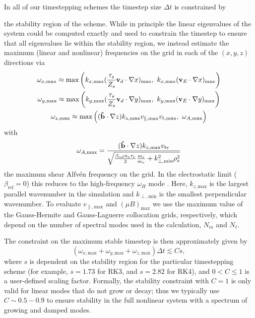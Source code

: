 \documentclass{jpp}
\renewcommand{\vec}[1]{\ensuremath{\mbox{$ {\bf #1} $}}} %
\begin{document}
In all of our timestepping schemes the timestep size $\Delta t$ is constrained by {\color{black} the stability region of the scheme. While in principle the linear eigenvalues of the system could be computed exactly and used to constrain the timestep to ensure that all eigenvalues lie within the stability region, we instead estimate the maximum (linear and nonlinear) frequencies on the grid in each of the $(x,y,z)$ directions via
\begin{gather}
    \omega_{x,\mathrm{max}} \approx \max\left(k_{x,\mathrm{max}} (\frac{\tau_s}{Z_s}\vec{v}_d\cdot\nabla x)_\mathrm{max},\ k_{x,\mathrm{max}} (\vec{v}_E\cdot \nabla x)_\mathrm{max}\right) \\
    \omega_{y,\mathrm{max}} \approx \max\left(k_{y,\mathrm{max}} (\frac{\tau_s}{Z_s}\vec{v}_d\cdot\nabla y)_\mathrm{max},\ k_{y,\mathrm{max}} (\vec{v}_E\cdot \nabla y)_\mathrm{max}\right) \\
    \omega_{z,\mathrm{max}} \approx \max \left((\bhat\cdot\nabla z)k_{z,\mathrm{max}} v_{\parallel,\mathrm{max}}  v_{t,\mathrm{max}},\  \omega_{A,\mathrm{max}}\right)
\end{gather}
with 
\begin{equation}
   \omega_{A,\mathrm{max}} = \frac{({\bf \hat{b}}\cdot\nabla z)k_{z,\mathrm{max}} v_{te}}{\sqrt{\frac{\beta_\mathrm{ref}n_e \tau_e}{2}\frac{m_i}{m_e} + k_{\perp,\mathrm{min}}^2 \rho_s^2}}
\end{equation}
the maximum shear Alfv\'en frequency on the grid. In the electrostatic limit ($\beta_\mathrm{ref} = 0$) this reduces to the high-frequency $\omega_H$ mode \citep{lee1987}.
Here, $k_{z,\mathrm{max}}$ is the largest parallel wavenumber in the simulation and $k_{\perp,\mathrm{min}}$ is the smallest perpendicular wavenumber. To evaluate $v_{\parallel,\mathrm{max}}$ and $(\mu B)_\mathrm{max}$ we use the maximum value of the Gauss-Hermite and Gauss-Laguerre collocation grids, respectively, which depend on the number of spectral modes used in the calculation, $N_m$ and $N_\ell$. 

The constraint on the maximum stable timestep is then approximately given by
\begin{equation}
    (\omega_{x,\mathrm{max}} + \omega_{y,\mathrm{max}} + \omega_{z,\mathrm{max}})\Delta t \lesssim C s,
\end{equation}
where $s$ is dependent on the stability region for the particular timestepping scheme (for example, $s=1.73$ for RK3, and $s=2.82$ for RK4), and $0<C\leq 1$ is a user-defined scaling factor. Formally, the stability constraint with $C=1$ is only valid for linear modes that do not grow or decay; thus we typically use $C\sim0.5-0.9$ to ensure stability in the full nonlinear system with 
 a spectrum of growing and damped modes.}
\end{document}
